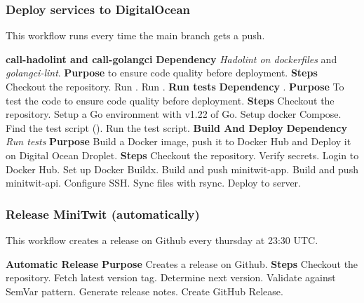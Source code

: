 \subsubsection{Deploy services to DigitalOcean}
This workflow runs every time the main branch gets a push.
\begin{outline}[enumerate]
    \1 \textbf{call-hadolint and call-golangci}
        \2 \textbf{Dependency}
            \3 \textit{Hadolint on dockerfiles} and \textit{golangci-lint}.
        \2 \textbf{Purpose} 
            \3 to ensure code quality before deployment.
        \2 \textbf{Steps}
            \3 Checkout the repository.
            \3 Run .
            \3 Run .
    \1 \textbf{Run tests}
        \2 \textbf{Dependency}
            \3 .
        \2 \textbf{Purpose}
            \3 To test the code to ensure code quality before deployment.
        \2 \textbf{Steps}
            \3 Checkout the repository.
            \3 Setup a Go environment with v1.22 of Go.
            \3 Setup docker Compose.
            \3 Find the test script ().
            \3 Run the test script.
    \1 \textbf{Build And Deploy}
        \2 \textbf{Dependency}
            \3 \textit{Run tests}
        \2 \textbf{Purpose}
            \3 Build a Docker image, push it to Docker Hub and Deploy it on Digital Ocean Droplet.
        \2 \textbf{Steps}
            \3 Checkout the repository.
            \3 Verify secrets.
            \3 Login to Docker Hub.
            \3 Set up Docker Buildx.
            \3 Build and push minitwit-app.
            \3 Build and push minitwit-api.
            \3 Configure SSH.
            \3 Sync files with rsync.
            \3 Deploy to server.
\end{outline}

\subsubsection{Release MiniTwit (automatically)}
This workflow creates a release on Github every thursday at 23:30 UTC.
\begin{outline}[enumerate]
    \1 \textbf{Automatic Release}
        \2 \textbf{Purpose} 
            \3 Creates a release on Github.
        \2 \textbf{Steps}
            \3 Checkout the repository.
            \3 Fetch latest version tag.
            \3 Determine next version.
            \3 Validate against SemVar pattern.
            \3 Generate release notes.
            \3 Create GitHub Release.
\end{outline}